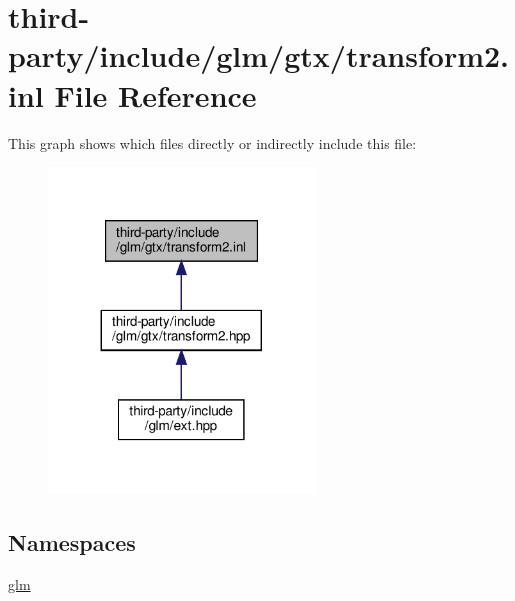 \hypertarget{transform2_8inl}{}\section{third-\/party/include/glm/gtx/transform2.inl File Reference}
\label{transform2_8inl}
This graph shows which files directly or indirectly include this file\+:
\nopagebreak
\begin{figure}[H]
\begin{center}
\leavevmode
\includegraphics[width=200pt]{transform2_8inl__dep__incl}
\end{center}
\end{figure}
\subsection*{Namespaces}
\begin{DoxyCompactItemize}
\item 
 \hyperlink{namespaceglm}{glm}
\end{DoxyCompactItemize}
